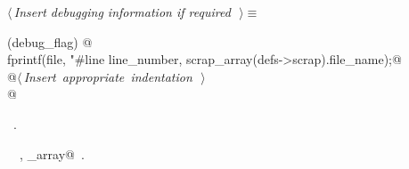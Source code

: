 \documentclass{report}
\begin{document}
\begin{flushleft} \small
\begin{minipage}{\linewidth} \label{scrap178}
$\langle\,${\it Insert debugging information if required}\nobreak\ {\footnotesize {}}$\,\rangle\equiv$
\vspace{-1ex}
\begin{list}{}{} \item
\mbox{}\verb@if (debug_flag) {@\\
\mbox{}\verb@  fprintf(file, "\n#line %d \"%s\"\n",@\\
\mbox{}\verb@          line_number, scrap_array(defs->scrap).file_name);@\\
\mbox{}\verb@  @\hbox{$\langle\,${\it Insert appropriate indentation}\nobreak\ {\footnotesize {}}$\,\rangle$}\verb@@\\
\mbox{}\verb@}@{\NWsep}
\end{list}
\vspace{-1ex}
\footnotesize\addtolength{\baselineskip}{-1ex}
\begin{list}{}{\setlength{\itemsep}{-\parsep}\setlength{\itemindent}{-\leftmargin}}
\item \NWtxtMacroRefIn\ .
\end{list}
\vspace{-2ex}
\footnotesize\addtolength{\baselineskip}{-1ex}
\begin{list}{}{\setlength{\itemsep}{-\parsep}\setlength{\itemindent}{-\leftmargin}}
\item \NWtxtIdentsUsed\nobreak\  \verb@fprintf@\nobreak\ , \verb@scrap_array@\nobreak\ .\end{list}
\end{minipage}\\[4ex]
\end{flushleft}
\end{document}
